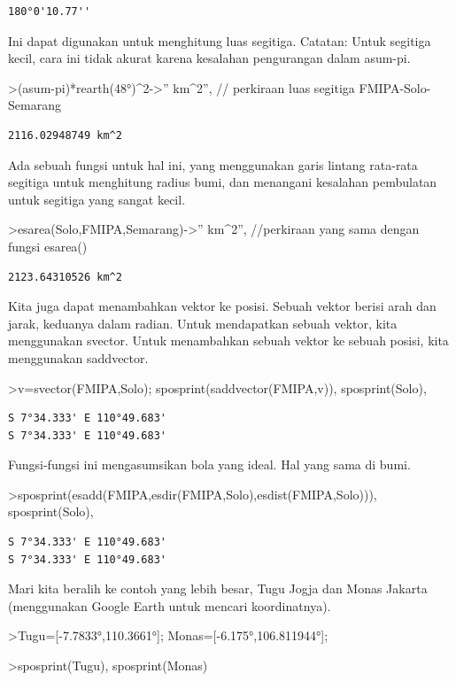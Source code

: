 \documentclass[
]{book}
\begin{document}
\begin{verbatim}
180°0'10.77''
\end{verbatim}

Ini dapat digunakan untuk menghitung luas segitiga. Catatan: Untuk segitiga kecil, cara ini tidak akurat karena kesalahan pengurangan dalam asum-pi.

\textgreater(asum-pi)*rearth(48°)\^{}2-\textgreater'' km\^{}2'', // perkiraan luas segitiga FMIPA-Solo-Semarang

\begin{verbatim}
2116.02948749 km^2
\end{verbatim}

Ada sebuah fungsi untuk hal ini, yang menggunakan garis lintang rata-rata segitiga untuk menghitung radius bumi, dan menangani kesalahan pembulatan untuk segitiga yang sangat kecil.

\textgreater esarea(Solo,FMIPA,Semarang)-\textgreater'' km\^{}2'', //perkiraan yang sama dengan fungsi esarea()

\begin{verbatim}
2123.64310526 km^2
\end{verbatim}

Kita juga dapat menambahkan vektor ke posisi. Sebuah vektor berisi arah dan jarak, keduanya dalam radian. Untuk mendapatkan sebuah vektor, kita menggunakan svector. Untuk menambahkan sebuah vektor ke sebuah posisi, kita menggunakan saddvector.

\textgreater v=svector(FMIPA,Solo); sposprint(saddvector(FMIPA,v)), sposprint(Solo),

\begin{verbatim}
S 7°34.333' E 110°49.683'
S 7°34.333' E 110°49.683'
\end{verbatim}

Fungsi-fungsi ini mengasumsikan bola yang ideal. Hal yang sama di bumi.

\textgreater sposprint(esadd(FMIPA,esdir(FMIPA,Solo),esdist(FMIPA,Solo))), sposprint(Solo),

\begin{verbatim}
S 7°34.333' E 110°49.683'
S 7°34.333' E 110°49.683'
\end{verbatim}

Mari kita beralih ke contoh yang lebih besar, Tugu Jogja dan Monas Jakarta (menggunakan Google Earth untuk mencari koordinatnya).

\textgreater Tugu={[}-7.7833°,110.3661°{]}; Monas={[}-6.175°,106.811944°{]};

\textgreater sposprint(Tugu), sposprint(Monas)
\end{document}
